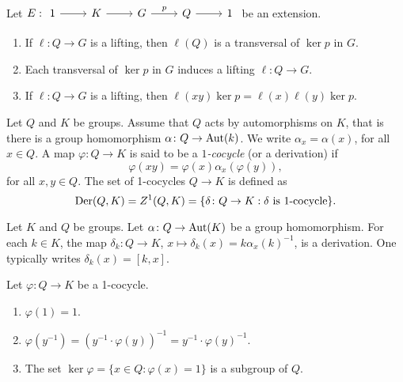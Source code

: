 \begin{exercise}
	\label{xca:lifting}
	Let $E:
	\begin{tikzcd}
	1 & K & G & Q & 1
	\arrow[from=1-1, to=1-2]
	\arrow[from=1-2, to=1-3]
	\arrow["p", from=1-3, to=1-4]
	\arrow[from=1-4, to=1-5]
    \end{tikzcd}$
	be an extension. 
	\begin{enumerate}
		\item If $\ell\colon Q\to G$ is a lifting, then $\ell(Q)$
			is a transversal of $\ker p$ in $G$.
		\item Each transversal of $\ker p$ in $G$ induces a lifting $\ell\colon
			Q\to G$.
		\item If $\ell\colon Q\to G$ is a lifting, then 
			$\ell(xy)\ker p=\ell(x)\ell(y)\ker p$.
	\end{enumerate}
\end{exercise}


Let $Q$ and $K$ be groups. Assume that $Q$ acts by automorphisms on $K$, that is there is a group homomorphism $\alpha\colon Q\rightarrow \operatorname{Aut}(k)$. We write $\alpha_x=\alpha(x)$, for all $x\in Q$.
A map $\varphi\colon Q\to K$ is said to be a {\em $1$-cocycle} (or a derivation) if
\[
		\varphi(xy)=\varphi(x)\alpha_x(\varphi(y)),
\]
for all $x,y\in Q$.  The set of 1-cocycles $Q\to K$ is defined as 
\[
\operatorname{Der}(Q,K)=Z^1(Q,K)=\{\delta\colon Q\to K:\text{$\delta$ is $1$-cocycle}\}.
\]

\begin{example}
	Let $K$ and $Q$ be groups. Let $\alpha\colon Q\rightarrow \operatorname{Aut}(K)$ be a group homomorphism.  
	For each $k\in K$, the map 
	$\delta_k\colon Q\to K$, $x\mapsto \delta_k(x)=k\alpha_x(k)^{-1}$, is a derivation. One typically writes
	$\delta_k(x)=[k,x]$. 
\end{example}

\begin{exercise}
	\label{xca:1cocycle}
	Let $\varphi\colon Q\to K$ be a 1-cocycle. 
	\begin{enumerate}
		\item $\varphi(1)=1$.
		\item $\varphi(y^{-1})=(y^{-1}\cdot\varphi(y))^{-1}=y^{-1}\cdot\varphi(y)^{-1}$.
		\item The set $\ker\varphi=\{x\in Q:\varphi(x)=1\}$ is a subgroup of $Q$. 
	\end{enumerate}
\end{exercise}




